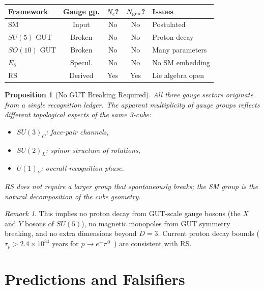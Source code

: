 \documentclass[12pt,a4paper]{article}
\newtheorem{proposition}[theorem]{Proposition}
\theoremstyle{definition}
\theoremstyle{remark}
\newtheorem{remark}[theorem]{Remark}
\begin{document}
{\small
\begin{center}
\renewcommand{\arraystretch}{1.3}
\begin{tabular}{@{}lcccp{3.2cm}@{}}
\toprule
\textbf{Framework} & \textbf{Gauge gp.} &
\textbf{$N_c$?} & \textbf{$N_{\rm gen}$?} &
\textbf{Issues} \\
\midrule
SM & Input & No & No & Postulated \\
$SU(5)$ GUT & Broken & No & No & Proton decay \\
$SO(10)$ GUT & Broken & No & No & Many parameters \\
$E_8$ & Specul. & No & No & No SM embedding \\
RS & Derived & Yes & Yes & Lie algebra open \\
\bottomrule
\end{tabular}
\end{center}
}

\begin{proposition}[No GUT Breaking Required]
\label{prop:no-gut}
All three gauge sectors originate from a single recognition
ledger.  The apparent multiplicity of gauge groups reflects
different topological aspects of the same 3-cube:
\begin{itemize}
  \item $SU(3)_C$: face-pair channels,
  \item $SU(2)_L$: spinor structure of rotations,
  \item $U(1)_Y$: overall recognition phase.
\end{itemize}
RS does not require a larger group that spontaneously breaks;
the SM group is the natural decomposition of the cube
geometry.
\end{proposition}

\begin{remark}
This implies no proton decay from GUT-scale gauge bosons (the
$X$ and $Y$ bosons of $SU(5)$), no magnetic monopoles from GUT
symmetry breaking, and no extra dimensions beyond $D = 3$.
Current proton decay bounds ($\tau_p > 2.4 \times
10^{34}$ years for $p \to e^+ \pi^0$~\cite{SuperK}) are
consistent with RS.
\end{remark}

\section{Predictions and Falsifiers}
\label{sec:predictions}
\end{document}
